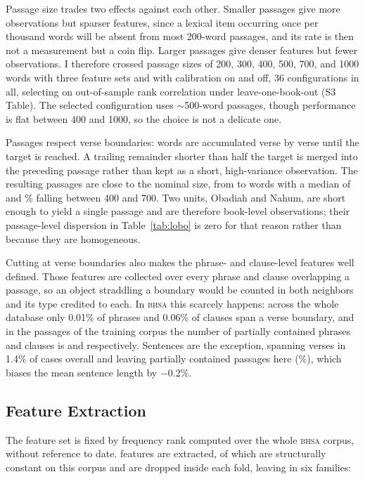 \documentclass[10pt,letterpaper]{article}
\newcommand{\bhsa}{\textsc{bhsa}}
\begin{document}
Passage size trades two effects against each other.  Smaller passages give more
observations but sparser features, since a lexical item occurring once per
thousand words will be absent from most 200-word passages, and its rate is then
not a measurement but a coin flip.  Larger passages give denser features but
fewer observations.  I therefore crossed passage sizes of 200, 300, 400, 500, 700, and 1000 words
with three feature sets and with calibration on and off, 36 configurations in
all, selecting on out-of-sample rank correlation under leave-one-book-out
(S3 Table).  The selected configuration uses $\sim$500-word
passages, though performance is flat between 400 and 1000, so the choice is not
a delicate one.

Passages respect verse boundaries: words are accumulated verse by verse until
the target is reached.  A trailing remainder shorter than half the target is
merged into the preceding passage rather than kept as a short, high-variance
observation.  The resulting passages are close to the nominal size, from
\cszMin{} to \cszMax{} words with a median of \cszMed{} and \cszBand\% falling
between 400 and 700.  Two units, Obadiah and Nahum, are short enough to yield a
single passage and are therefore book-level observations; their
passage-level dispersion in Table~\ref{tab:lobo} is zero for that reason rather
than because they are homogeneous.

Cutting at verse boundaries also makes the phrase- and clause-level features
well defined.  Those features are collected over every phrase and clause
overlapping a passage, so an object straddling a boundary would be counted in
both neighbors and its type credited to each.  In \bhsa{} this scarcely
happens: across the whole database only 0.01\% of phrases and 0.06\% of clauses
span a verse boundary, and in the \HBchunks{} passages of the training corpus
the number of partially contained phrases and clauses is \bndPhr{} and \bndCl{}
respectively.  Sentences are the exception, spanning verses in 1.4\% of cases
overall and leaving \bndSent{} partially contained passages here
(\bndSentPct\%), which biases the mean sentence length by $-0.2$\%.

\subsection*{Feature Extraction}

The feature set is fixed by frequency rank computed over the whole \bhsa{}
corpus, without reference to date.  \Fextract{} features are extracted, of which
\Fdead{} are structurally constant on this corpus and are dropped inside each
fold, leaving \HBfeat{} in six families:
\end{document}
